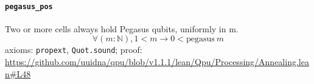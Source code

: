 \documentclass[11pt]{article}
\begin{document}
\paragraph{\texttt{pegasus\_pos}}
Two or more cells always hold Pegasus qubits, uniformly in m.
\[ \forall (m : \mathbb{N}), 1 < m \to 0 < \mathrm{pegasus}\ m \]
\noindent axioms: \texttt{propext}, \texttt{Quot.sound}; proof: \url{https://github.com/uuidna/qpu/blob/v1.1.1/lean/Qpu/Processing/Annealing.lean\#L48}
\end{document}
